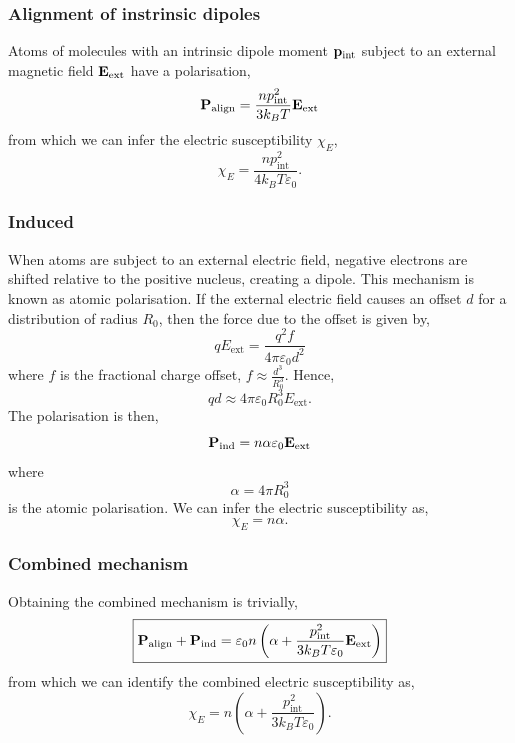 \documentclass{book}
\begin{document}
\subsubsection{Alignment of instrinsic dipoles}
Atoms of molecules with an intrinsic dipole moment $\vb{p}_{\text{int}}$ subject to an external magnetic field $\vb{E}_{\text{ext}}$ have a polarisation,
\begin{equation}
	\vb{P}_{\text{align}} = \frac{np_{\text{int}}^2}{3k_BT}\vb{E}_{\text{ext}}
\end{equation}
from which we can infer the electric susceptibility $\chi_E$,
\begin{equation}
	\chi_E = \frac{np_{\text{int}}^2}{4k_BT\varepsilon_0}.
\end{equation}
\subsubsection{Induced}
When atoms are subject to an external electric field, negative electrons are shifted relative to the positive nucleus, creating a dipole. This mechanism is known as atomic polarisation. If the external electric field causes an offset $d$ for a distribution of radius $R_0$, then the force due to the offset is given by,
\begin{equation}
	qE_{\text{ext}} = \frac{q^2f}{4\pi\varepsilon_0d^2}
\end{equation}
where $f$ is the fractional charge offset, $f \approx \frac{d^3}{R_0^3}$. Hence,
\begin{equation}
	qd \approx 4\pi\varepsilon_0R_0^3E_{\text{ext}}.
\end{equation}
The polarisation is then,
\begin{equation}
	\vb{P}_{\text{ind}} = n\alpha \varepsilon_0\vb{E}_{\text{ext}}
\end{equation}
where 
\begin{equation}
	\alpha = 4\pi R_0^3
\end{equation}
is the atomic polarisation. We can infer the electric susceptibility as,
\begin{equation}
	\chi_E = n\alpha.
\end{equation}
\subsubsection{Combined mechanism}
Obtaining the combined mechanism is trivially,
\begin{equation}
	\boxed{\vb{P}_{\text{align}} + \vb{P}_{\text{ind}} = \varepsilon_0n\left(\alpha + \frac{p_{\text{int}}^2}{3k_BT\varepsilon_0}\vb{E}_{\text{ext}}\right)}
\end{equation}
from which we can identify the combined electric susceptibility as,
\begin{equation}
	\boxed{\chi_E = n\left(\alpha + \frac{p_{\text{int}}^2}{3k_BT\varepsilon_0}\right)}.
\end{equation}
\end{document}
